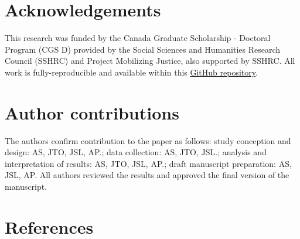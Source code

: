 \documentclass[10pt,letterpaper]{article}
\begin{document}
\hypertarget{acknowledgements}{%
\section{Acknowledgements}\label{acknowledgements}}

This research was funded by the Canada Graduate Scholarship - Doctoral
Program (CGS D) provided by the Social Sciences and Humanities Research
Council (SSHRC) and Project Mobilizing Justice, also supported by SSHRC.
All work is fully-reproducible and available within this
\href{https://github.com/soukhova/Multimodal-spatial-availability}{GitHub
repository}.

\hypertarget{author-contributions}{%
\section{Author contributions}\label{author-contributions}}

The authors confirm contribution to the paper as follows: study
conception and design: AS, JTO, JSL, AP.; data collection: AS, JTO,
JSL.; analysis and interpretation of results: AS, JTO, JSL, AP.; draft
manuscript preparation: AS, JSL, AP. All authors reviewed the results
and approved the final version of the manuscript.

\hypertarget{references}{%
\section*{References}\label{references}}
\end{document}
